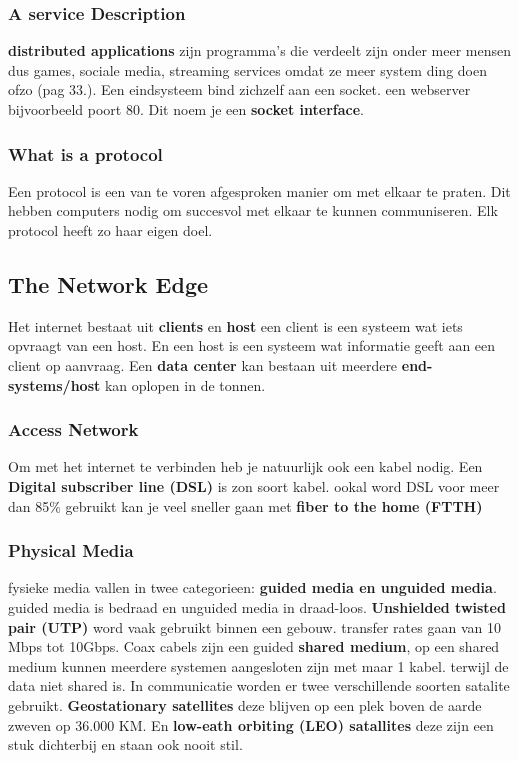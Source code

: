 \subsubsection{A service Description}
\textbf{distributed applications} zijn programma's die verdeelt zijn onder meer mensen dus games, sociale media, streaming services omdat ze meer system ding doen ofzo (pag 33.).
\newline
Een eindsysteem bind zichzelf aan een socket. een webserver bijvoorbeeld poort 80. Dit noem je een \textbf{socket interface}.

\subsubsection{What is a protocol}
Een protocol is een van te voren afgesproken manier om met elkaar te praten. Dit hebben computers nodig om succesvol met elkaar te kunnen communiseren. Elk protocol heeft zo haar eigen doel.

\subsection{The Network Edge}
Het internet bestaat uit \textbf{clients} en \textbf{host} een client is een systeem wat iets opvraagt van een host. En een host is een systeem wat informatie geeft aan een client op aanvraag. Een \textbf{data center} kan bestaan uit meerdere \textbf{end-systems/host} kan oplopen in de tonnen.

\subsubsection{Access Network}
Om met het internet te verbinden heb je natuurlijk ook een kabel nodig. Een \textbf{Digital subscriber line (DSL)} is zon soort kabel. ookal word DSL voor meer dan 85\% gebruikt kan je veel sneller gaan met \textbf{fiber to the home (FTTH)}

\subsubsection{Physical Media}
fysieke media vallen in twee categorieen: \textbf{guided media en unguided media}. guided media is bedraad en unguided media in draad-loos.
\newline
\textbf{Unshielded twisted pair (UTP)} word vaak gebruikt binnen een gebouw. transfer rates gaan van 10 Mbps tot 10Gbps. Coax cabels zijn een guided \textbf{shared medium}, op een shared medium kunnen meerdere systemen aangesloten zijn met maar 1 kabel. terwijl de data niet shared is.
\newline
In communicatie worden er twee verschillende soorten satalite gebruikt. \textbf{Geostationary satellites} deze blijven op een plek boven de aarde zweven op 36.000 KM. En \textbf{low-eath orbiting (LEO) satallites} deze zijn een stuk dichterbij en staan ook nooit stil.
